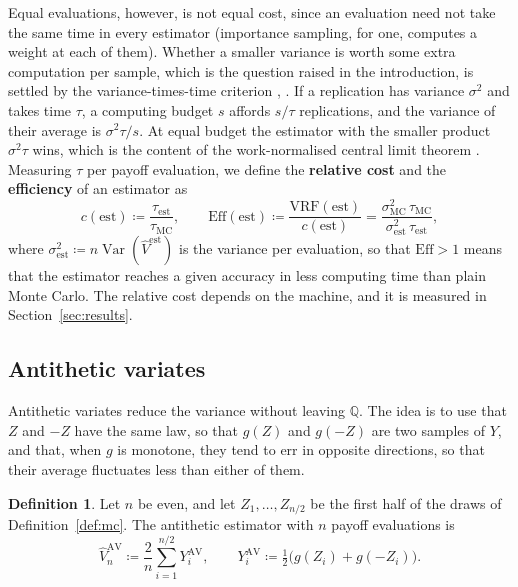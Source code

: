 \documentclass[11pt,a4paper]{article}
\theoremstyle{plain}
\theoremstyle{definition}
\newtheorem{definition}[theorem]{Definition}
\theoremstyle{remark}
\newcommand{\Q}{\mathbb{Q}}
\newcommand{\1}{\mathbf{1}}
\newcommand{\eqdef}{\coloneqq}
\newcommand{\Var}{\operatorname{Var}}
\newcommand{\VRF}{\mathrm{VRF}}
\newcommand{\Eff}{\mathrm{Eff}}
\begin{document}
Equal evaluations, however, is not equal cost, since an evaluation need not take the same time in every estimator (importance sampling, for one, computes a weight at each of them). Whether a smaller variance is worth some extra computation per sample, which is the question raised in the introduction, is settled by the variance-times-time criterion \cite[\S 1.1.3]{glasserman}, \cite{portfolio}. If a replication has variance $\sigma^2$ and takes time $\tau$, a computing budget $s$ affords $s/\tau$ replications, and the variance of their average is $\sigma^2\tau/s$. At equal budget the estimator with the smaller product $\sigma^2\tau$ wins, which is the content of the work-normalised central limit theorem \cite[(1.11)]{glasserman}. Measuring $\tau$ per payoff evaluation, we define the \textbf{relative cost} and the \textbf{efficiency} of an estimator as
\begin{equation}\label{eq:eff}
  c(\mathrm{est}) \eqdef \frac{\tau_{\mathrm{est}}}{\tau_{\mathrm{MC}}},
  \qquad
  \Eff(\mathrm{est}) \eqdef \frac{\VRF(\mathrm{est})}{c(\mathrm{est})} = \frac{\sigma^2_{\mathrm{MC}}\,\tau_{\mathrm{MC}}}{\sigma^2_{\mathrm{est}}\,\tau_{\mathrm{est}}},
\end{equation}
where $\sigma^2_{\mathrm{est}} \eqdef n\Var(\hat V^{\mathrm{est}})$ is the variance per evaluation, so that $\Eff > 1$ means that the estimator reaches a given accuracy in less computing time than plain Monte Carlo. The relative cost depends on the machine, and it is measured in Section~\ref{sec:results}.

\subsection{Antithetic variates}
\label{subsec:av}

Antithetic variates reduce the variance without leaving $\Q$. The idea is to use that $Z$ and $-Z$ have the same law, so that $g(Z)$ and $g(-Z)$ are two samples of $Y$, and that, when $g$ is monotone, they tend to err in opposite directions, so that their average fluctuates less than either of them.

\begin{definition}\label{def:av}
Let $n$ be even, and let $Z_1, \dots, Z_{n/2}$ be the first half of the draws of Definition~\ref{def:mc}. The antithetic estimator with $n$ payoff evaluations is
\[
  \hat V^{\mathrm{AV}}_n \eqdef \frac{2}{n} \sum_{i=1}^{n/2} Y_i^{\mathrm{AV}},
  \qquad
  Y_i^{\mathrm{AV}} \eqdef \tfrac12\bigl(g(Z_i) + g(-Z_i)\bigr).
\]
\end{definition}
\end{document}
